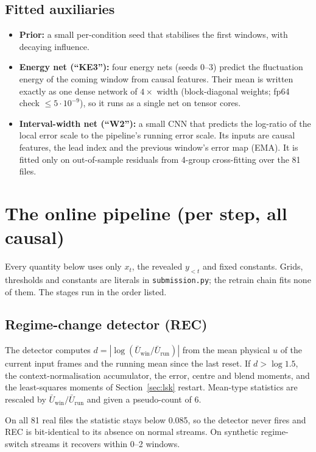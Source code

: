 \documentclass[10pt]{article}
\newcommand{\cfg}[1]{\texttt{#1}}
\begin{document}
\subsection{Fitted auxiliaries}
\begin{itemize}
\item \textbf{Prior:} a small per-condition seed that stabilises the first windows, with decaying influence.
\item \textbf{Energy net (``KE3''):} four energy nets (seeds 0--3) predict the fluctuation energy of the coming
  window from causal features. Their mean is written exactly as one dense network of $4\times$ width
  (block-diagonal weights; fp64 check $\le5\cdot10^{-9}$), so it runs as a single net on tensor cores.
\item \textbf{Interval-width net (``W2''):} a small CNN that predicts the log-ratio of the local error scale to the
  pipeline's running error scale. Its inputs are causal features, the lead index and the previous window's error
  map (EMA). It is fitted only on out-of-sample residuals from 4-group cross-fitting over the 81 files.
\end{itemize}

\section{The online pipeline (per step, all causal)}

Every quantity below uses only $x_t$, the revealed $y_{<t}$ and fixed constants. Grids, thresholds and
constants are literals in \cfg{submission.py}; the retrain chain fits none of them. The stages run in the order
listed.

\subsection{Regime-change detector (REC)}
The detector computes $d=|\log(\bar U_{\text{win}}/\bar U_{\text{run}})|$ from the mean physical $u$ of the
current input frames and the running mean since the last reset. If $d>\log1.5$, the context-normalisation
accumulator, the error, centre and blend moments, and the least-squares moments of
Section~\ref{sec:lsk} restart. Mean-type statistics are rescaled by
$\bar U_{\text{win}}/\bar U_{\text{run}}$ and given a pseudo-count of 6.

On all 81 real files the statistic stays below 0.085, so the detector never fires and REC is bit-identical to
its absence on normal streams. On synthetic regime-switch streams it recovers within 0--2 windows.
\end{document}
